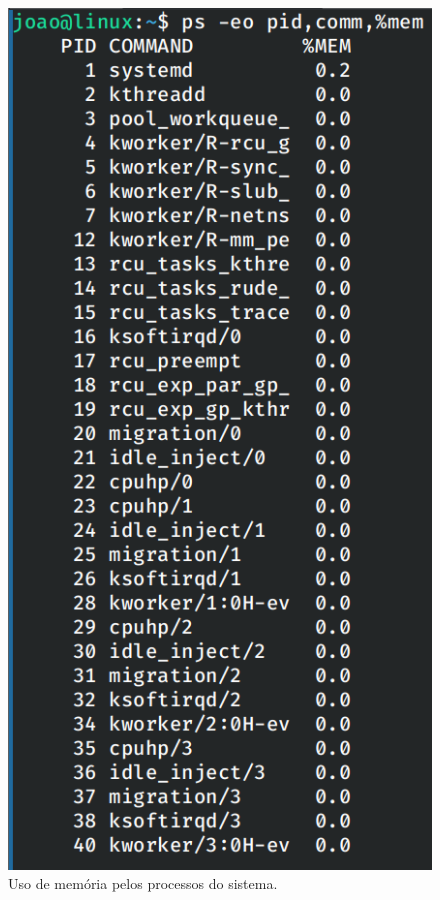 \documentclass[
	12pt,				%
	oneside,   	        %
	a4paper,			%
	english,			%
	french,				%
	spanish,			%
	brazil,				%
	]{pacotes/abntex2}
\begin{document}
\begin{figure}[H]
  \centering
  \includegraphics[scale=0.45]{figuras/mem.png}
  \caption{Uso de memória pelos processos do sistema.}
  \label{fig:mem}
\end{figure}
\end{document}
